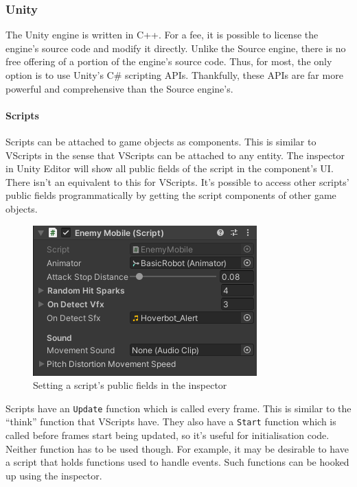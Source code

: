 \documentclass[a4paper, 12pt]{scrartcl}
\begin{document}
\subsubsection{Unity}
The Unity engine is written in C++. For a fee, it is possible to license the engine's source code and modify it directly. Unlike the Source engine, there is no free offering of a portion of the engine's source code. Thus, for most, the only option is to use Unity's C\# scripting APIs. Thankfully, these APIs are far more powerful and comprehensive than the Source engine's.

\paragraph{Scripts}
Scripts can be attached to game objects as components. This is similar to VScripts in the sense that VScripts can be attached to any entity. The inspector in Unity Editor will show all public fields of the script in the component's UI. There isn't an equivalent to this for VScripts. It's possible to access other scripts' public fields programmatically by getting the script components of other game objects.

\begin{figure}[!htb]
  \centering
  \includegraphics[scale=0.75]{images/unity_script_inspector.png}
  \caption{Setting a script's public fields in the inspector}
  \label{fig:unity_script_inspector}
\end{figure}

Scripts have an \texttt{Update} function which is called every frame. This is similar to the ``think'' function that VScripts have. They also have a \texttt{Start} function which is called before frames start being updated, so it's useful for initialisation code. Neither function has to be used though. For example, it may be desirable to have a script that holds functions used to handle events. Such functions can be hooked up using the inspector.
\end{document}
